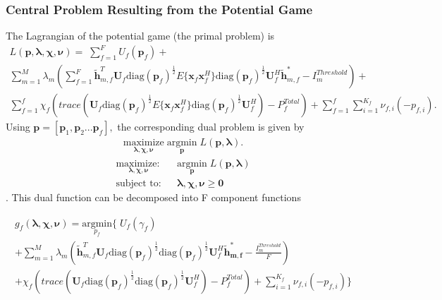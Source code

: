 \documentclass[12pt,a4paper]{report}
\begin{document}
\subsubsection{Central Problem Resulting from the Potential Game}
The Lagrangian of the potential game (the primal problem) is
\begin{multline}
L(\mathbf{\mathbf{p},\boldsymbol{\lambda},\boldsymbol{\chi},\boldsymbol{\nu}}) = 
\;
\sum_{f=1}^F U_{f}(\mathbf{p}_{f}) 
+\\
\sum_{m=1}^M \lambda_{m}
(	  \sum^F_{f=1} \mathbf{\tilde{h}}_{m,f}^T \mathbf{U}_{f} 
	\mathrm{diag}(\mathbf{p}_{f})^{\frac{1}{2}}
	E\{\mathbf{x}_{f}\mathbf{x}_{f}^H\}\mathrm{diag}(\mathbf{p}_{f})^{\frac{1}{2}}\mathbf{U}_{f} ^H					
	 \mathbf{\tilde{h}}_{m,f}^* - I^{Threshold}		
	_{m} )+
\\
\sum_{f=1}^f
\chi_{f}(trace(\mathbf{U}_{f} 
	\mathrm{diag}(\mathbf{p}_{f})^{\frac{1}{2}}
	E\{\mathbf{x}_{f}\mathbf{x}_{f}^H\}\mathrm{diag}(\mathbf{p}_{f})^{\frac{1}{2}}\mathbf{U}_{f} ^H	)-P^{Total}_{f} )
+
\sum_{f=1}^f
\sum_{i=1}^{K_{f}}
\nu_{f,i}(-p_{f,i}).
\end{multline}
Using $\mathbf{p}= [\mathbf{p}_1, \mathbf{p}_2...\mathbf{p}_{f}],$ the corresponding dual problem is given by
\begin{gather*}
\underset{\boldsymbol{\lambda},\boldsymbol{\chi},\boldsymbol{\nu}}{\mathrm{maximize}}\;\underset{\mathbf{p}}{\mathrm{argmin}}\;L(\mathbf{\mathbf{p},\lambda}).
\end{gather*}
		\begin{subequations}
	\label{optim}
	\begin{align}
\underset{\boldsymbol{\lambda},\boldsymbol{\chi},\boldsymbol{\nu}}{\mathrm{maximize:}}&&\underset{\mathbf{p}}{\mathrm{argmin}}\;L(\mathbf{\mathbf{p},\lambda})\\
\text{subject to:}&& \boldsymbol{\lambda},\boldsymbol{\chi},\boldsymbol{\nu} \geq \boldsymbol{0}
	\end{align}
	\end{subequations}.
This dual function can be decomposed into F component functions


\begin{multline}
g_f(\boldsymbol{\lambda},\boldsymbol{\chi},\boldsymbol{\nu}) = \underset{p_{f}}{\mathrm{argmin}}
\{
\;
U_{f}(\gamma_{f}) 
\\+
\sum_{m=1}^M \lambda_{m}
(\mathbf{\tilde{h}}_{m,f}^T  \mathbf{U}_{f} 
	\mathrm{diag}(\mathbf{p}_{f})^{\frac{1}{2}}
	\mathrm{diag}(\mathbf{p}_{f})^{\frac{1}{2}}\mathbf{U}_{f} ^H \mathbf{\tilde{h}_{m,f}^*} - \frac{I^{Threshold}_{m}}{F})
\\
+ 
\chi_{f}(trace(\mathbf{U}_{f} 
	\mathrm{diag}(\mathbf{p}_{f})^{\frac{1}{2}}
	\mathrm{diag}(\mathbf{p}_{f})^{\frac{1}{2}}\mathbf{U}_{f} ^H)-P^{Total}_{f} )
+
\sum_{i=1}^{K_f}
\nu_{f,i}(-p_{f,i})\}
\end{multline}
\\
\end{document}
